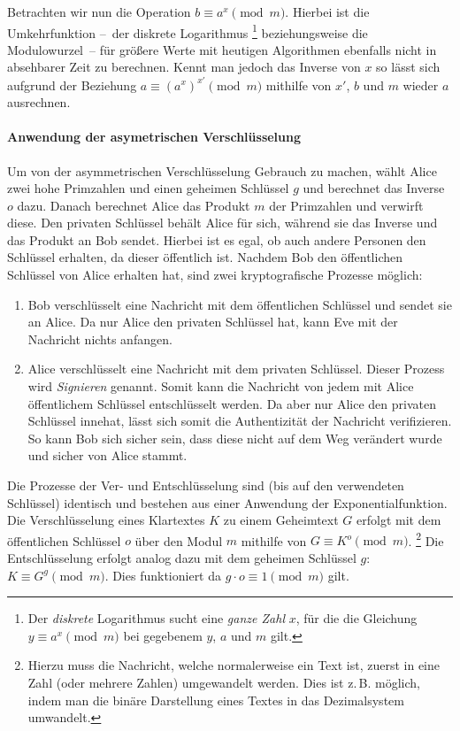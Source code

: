 Betrachten wir nun die Operation $b \equiv a^x \pmod{m}$.
Hierbei ist die Umkehrfunktion --~der diskrete Logarithmus%
\footnote{Der \emph{diskrete} Logarithmus sucht eine \emph{ganze Zahl} $x$, für die die Gleichung $y \equiv a^x \pmod{m}$ bei gegebenem $y$, $a$ und $m$ gilt.}
beziehungsweise die Modulowurzel~-- für größere Werte mit heutigen Algorithmen ebenfalls nicht in absehbarer Zeit zu berechnen.
Kennt man jedoch das Inverse von $x$ so lässt sich aufgrund der Beziehung $a \equiv (a^x)^{x'} \pmod{m}$ mithilfe von $x'$, $b$ und $m$ wieder $a$ ausrechnen.

\paragraph{Anwendung der asymetrischen Verschlüsselung}

Um von der asymmetrischen Verschlüsselung Gebrauch zu machen, wählt Alice zwei hohe Primzahlen und einen geheimen Schlüssel $g$ und berechnet das Inverse $o$ dazu.
Danach berechnet Alice das Produkt $m$ der Primzahlen und verwirft diese.
Den privaten Schlüssel behält Alice für sich, während sie das Inverse und das Produkt an Bob sendet.
Hierbei ist es egal, ob auch andere Personen den Schlüssel erhalten, da dieser öffentlich ist.
Nachdem Bob den öffentlichen Schlüssel von Alice erhalten hat, sind zwei kryptografische Prozesse möglich:
\begin{enumerate}
    \item Bob verschlüsselt eine Nachricht mit dem öffentlichen Schlüssel und sendet sie an Alice.
    Da nur Alice den privaten Schlüssel hat, kann Eve mit der Nachricht nichts anfangen.
    \item Alice verschlüsselt eine Nachricht mit dem privaten Schlüssel.
    Dieser Prozess wird \emph{Signieren} genannt.
    Somit kann die Nachricht von jedem mit Alice öffentlichem Schlüssel entschlüsselt werden.
    Da aber nur Alice den privaten Schlüssel innehat, lässt sich somit die Authentizität der Nachricht verifizieren.
    So kann Bob sich sicher sein, dass diese nicht auf dem Weg verändert wurde und sicher von Alice stammt.
\end{enumerate}

Die Prozesse der Ver- und Entschlüsselung sind (bis auf den verwendeten Schlüssel) identisch und bestehen aus einer Anwendung der Exponentialfunktion.
Die Verschlüsselung eines Klartextes $K$ zu einem Geheimtext $G$ erfolgt mit dem öffentlichen Schlüssel $o$ über den Modul $m$ mithilfe von $G \equiv K^o \pmod{m}$.%
\footnote{Hierzu muss die Nachricht, welche normalerweise ein Text ist, zuerst in eine Zahl (oder mehrere Zahlen) umgewandelt werden.
Dies ist z.\,B. möglich, indem man die binäre Darstellung eines Textes in das Dezimalsystem umwandelt.}
Die Entschlüsselung erfolgt analog dazu mit dem geheimen Schlüssel $g$: $K \equiv G^g \pmod{m}$.
Dies funktioniert da $g \cdot o \equiv 1 \pmod{m}$ gilt.


